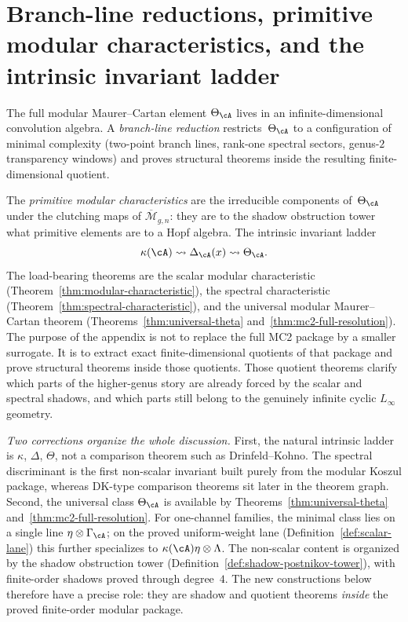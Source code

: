 \chapter[Branch-line reductions and primitive modular characteristics]{Branch-line reductions, primitive modular characteristics, and the intrinsic invariant ladder}
\label{app:branch-line-reductions}

The full modular Maurer--Cartan element $\Theta_\cA$ lives in an
infinite-dimensional convolution algebra. A \emph{branch-line
reduction} restricts~$\Theta_\cA$ to a configuration of minimal
complexity (two-point branch lines, rank-one spectral sectors,
genus-$2$ transparency windows) and proves structural theorems
inside the resulting finite-dimensional quotient.

The \emph{primitive modular characteristics} are the irreducible
components of~$\Theta_\cA$ under the clutching maps of
$\overline{\mathcal{M}}_{g,n}$: they are to the shadow obstruction
tower what primitive elements are to a Hopf algebra. The intrinsic
invariant ladder
\[
\kappa(\cA)
\rightsquigarrow
\Delta_{\cA}(x)
\rightsquigarrow
\Theta_{\cA}.
\]
The load-bearing theorems are the scalar modular characteristic
(Theorem~\ref{thm:modular-characteristic}), the spectral characteristic
(Theorem~\ref{thm:spectral-characteristic}), and the universal modular
Maurer--Cartan theorem
(Theorems~\ref{thm:universal-theta} and~\ref{thm:mc2-full-resolution}).
The purpose of the appendix is not to replace the full MC2 package by a
smaller surrogate. It is to extract exact finite-dimensional quotients
of that package and prove structural theorems inside those quotients.
Those quotient theorems clarify which parts of the higher-genus story are
already forced by the scalar and spectral shadows, and which parts still
belong to the genuinely infinite cyclic \(L_\infty\) geometry.

\medskip
\noindent\emph{Two corrections organize the whole discussion.}
First, the natural intrinsic ladder is
\(\kappa\), \(\Delta\), \(\Theta\), not a comparison theorem such as
Drinfeld--Kohno. The spectral discriminant is the first non-scalar
invariant built purely from the modular Koszul package, whereas DK-type
comparison theorems sit later in the theorem graph.
Second, the universal class \(\Theta_{\cA}\) is available by
Theorems~\ref{thm:universal-theta} and~\ref{thm:mc2-full-resolution}.
For one-channel families, the minimal class lies on a single line
\(\eta\otimes\Gamma_{\cA}\); on the proved uniform-weight lane
(Definition~\ref{def:scalar-lane}) this further
specializes to \(\kappa(\cA)\eta\otimes\Lambda\).
The non-scalar content is organized by the shadow
obstruction tower (Definition~\ref{def:shadow-postnikov-tower}),
with finite-order shadows proved through degree~$4$.
The new constructions below therefore have a precise role: they are
shadow and quotient theorems \emph{inside} the proved
finite-order modular package.

